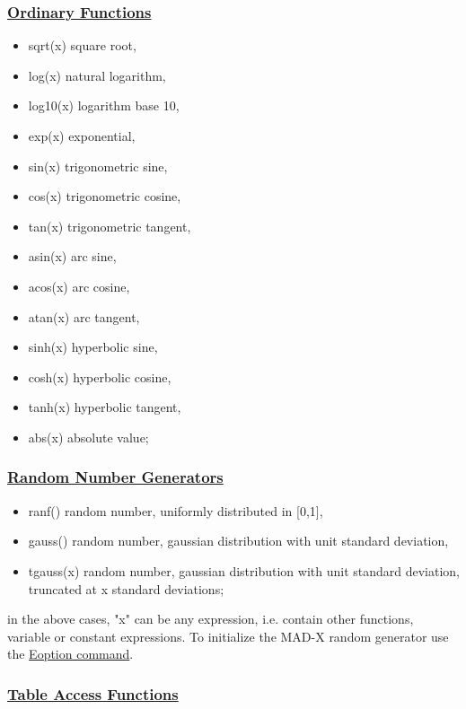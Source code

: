 \subsubsection{\href{function}{Ordinary Functions}}
\label{subsubsec:function}
\begin{itemize}
	\item sqrt(x) square root, 
	\item log(x) natural logarithm, 
	\item log10(x) logarithm base 10, 
	\item exp(x) exponential, 
	\item sin(x) trigonometric sine, 
	\item cos(x) trigonometric cosine, 
	\item tan(x) trigonometric tangent, 
	\item asin(x) arc sine, 
	\item acos(x) arc cosine, 
	\item atan(x) arc tangent, 
	\item sinh(x) hyperbolic sine, 
	\item cosh(x) hyperbolic cosine, 
	\item tanh(x) hyperbolic tangent, 
	\item abs(x) absolute value; 
\end{itemize}

\subsubsection{\href{random}{Random Number Generators}}
\label{subsubsec:random}
\begin{itemize}
	\item ranf() random number, uniformly distributed in [0,1], 
	\item gauss() random number, gaussian distribution with unit standard deviation, 
	\item tgauss(x) random number, gaussian distribution with unit standard deviation, truncated at x standard deviations; 
\end{itemize} 

in the above cases, "x" can be any expression, i.e. contain other
functions, variable or constant expressions. To initialize the MAD-X
random generator use the
\href{../error/error_option.html#EOPTION}{Eoption command}.  

\subsubsection{\href{table}{Table Access Functions}}
\label{subsubsec:table}

